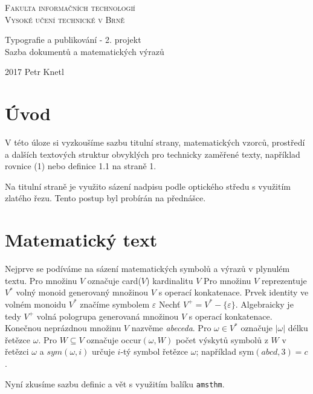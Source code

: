 \documentclass[a4paper, twocolumn, 11pt]{article}
\theoremstyle{definition}
\begin{document}
\pagestyle{empty}
\onecolumn
\begin{center} 
\Huge
\textsc{Fakulta informačních technologií\\Vysoké učení
technické v Brně}\\

Typografie a publikování - 2. projekt\\
Sazba dokumentů a matematických výrazů
\end{center}
{\LARGE 2017 \hfill
Petr Knetl}
\setcounter{page}{0}
\newpage

\pagestyle{plain}
\twocolumn
\section*{Úvod} 
V této úloze si vyzkoušíme sazbu titulní strany, matematických vzorců, prostředí a dalších textových struktur obvyklých pro technicky zaměřené texty, například rovnice (1) nebo definice 1.1 na straně 1. 

Na titulní straně je využito sázení nadpisu podle optického středu s využitím zlatého řezu. Tento postup byl probírán na přednášce.
\section{Matematický text}
Nejprve se podíváme na sázení matematických symbolů a výrazů v plynulém textu. Pro množinu $V$ označuje card($V$) kardinalitu $V$
Pro množinu $V$ reprezentuje $V^{*}$ volný monoid generovaný množinou $V$ s operací konkatenace.
Prvek identity ve volném monoidu $V^{*}$ značíme symbolem $\varepsilon$
Nechť $V^{+} = V^{*} - \{\varepsilon\}$. Algebraicky je tedy $V^{+}$ volná pologrupa generovaná množinou $V$ s operací konkatenace.
Konečnou neprázdnou množinu $V$ nazvěme \textit{abeceda}.
Pro $\omega \in V^{*}$ označuje $|\omega|$ délku řetězce $\omega$. Pro $W \subseteq V$ označuje occur$({\omega}, W)$ počet výskytů symbolů z $W$ v řetězci $\omega$ a $sym({\omega}, i)$ určuje $i$-tý symbol řetězce $\omega$; například sym$(abcd, 3) = c$.

Nyní zkusíme sazbu definic a vět s využitím balíku \texttt{amsthm}.
\end{document}
